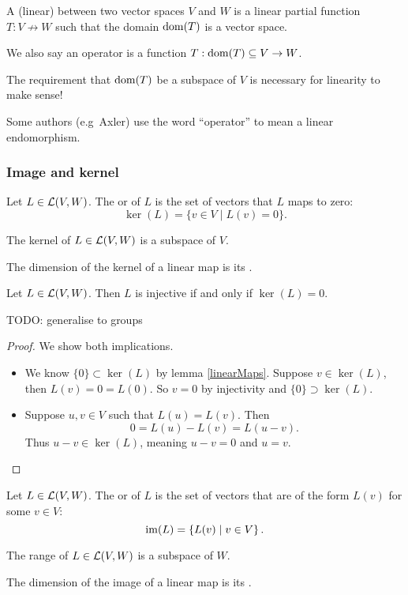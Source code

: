 \begin{definition}
A (linear)  between two vector spaces $V$ and $W$ is a linear partial function $T: V \not\to W$ such that the domain $\operatorname{dom}(T)$ is a vector space.

We also say an operator is a function $T: \operatorname{dom}(T)\subseteq V\to W$.
\end{definition}
The requirement that $\operatorname{dom}(T)$ be a subspace of $V$ is necessary for linearity to make sense!

Some authors (e.g\ Axler) use the word ``operator'' to mean a linear endomorphism.

\subsubsection{Image and kernel}
\begin{definition}
Let $L \in \operatorname{\mathcal{L}}(V,W)$. The  or  of $L$ is the set of vectors that $L$ maps to zero:
\[ \ker(L) = \{ v\in V \;|\; L(v) = 0 \}. \]
\end{definition}
\begin{proposition} \label{kernelSubspace}
The kernel of $L\in \operatorname{\mathcal{L}}(V,W)$ is a subspace of $V$.
\end{proposition}
\begin{definition}
The dimension of the kernel of a linear map is its .
\end{definition}
\begin{proposition} \label{injectivityKernelTriviality}
Let $L\in\operatorname{\mathcal{L}}(V,W)$. Then $L$ is injective if and only if $\ker(L) = 0$.
\end{proposition}
TODO: generalise to groups
\begin{proof}
We show both implications.
\begin{itemize}
\item[\boxed{\Rightarrow}] We know $\{0\}\subset \ker(L)$ by lemma \ref{linearMaps}. Suppose $v\in \ker(L)$, then $L(v) = 0 = L(0)$. So $v=0$ by injectivity and $\{0\}\supset \ker(L)$.
\item[\boxed{\Leftarrow}] Suppose $u,v \in V$ such that $L(u)=L(v)$. Then
\[ 0 = L(u) - L(v) = L(u-v). \]
Thus $u-v\in \ker(L)$, meaning $u-v = 0$ and $u=v$.
\end{itemize}
\end{proof}

\begin{definition}
Let $L \in \operatorname{\mathcal{L}}(V,W)$. The  or  of $L$ is the set of vectors that are of the form $L(v)$ for some $v\in V$:
\[ \operatorname{im}(L) = \left\{ L(v) \;\middle|\; v\in V \right\}. \]
\end{definition}
\begin{proposition}
The range of $L\in \operatorname{\mathcal{L}}(V,W)$ is a subspace of $W$.
\end{proposition}
\begin{definition}
The dimension of the image of a linear map is its .
\end{definition}

